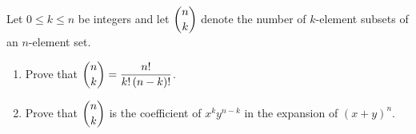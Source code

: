 Let $0\le k\le n$ be integers and let $\dbinom nk$ denote the number of $k$-element subsets of an $n$-element set.
\begin{enumerate}
\item[(a)] Prove that $\dbinom nk=\dfrac{n!}{k!\,(n-k)!}$.
\item[(b)] Prove that $\dbinom nk$ is the coefficient of $x^ky^{n-k}$ in the expansion of $(x+y)^n$.
\end{enumerate}
